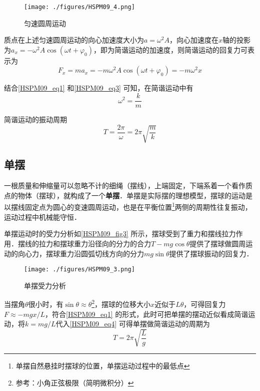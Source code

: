 \begin{figure}[ht]
\centering
\texttt{[image: ./figures/HSPM09\_4.png]}
\caption{匀速圆周运动} \label{HSPM09_fig4}
\end{figure}

质点在上述匀速圆周运动的向心加速度大小为$a=\omega^2 A$，向心加速度在$x$轴的投影为$a_x=-\omega^2 A\cos(\omega t + \varphi_0)$，即为简谐运动的加速度，则简谐运动的回复力可表示为
\begin{equation}\label{HSPM09_eq3}
F_x=ma_x=-m\omega^2 A\cos(\omega t + \varphi_0)= -m\omega^2 x
\end{equation}

结合\autoref{HSPM09_eq1} 和\autoref{HSPM09_eq3} 可知，在简谐运动中有
\begin{equation}
\omega^2=\frac km
\end{equation}

简谐运动的振动周期
\begin{equation}\label{HSPM09_eq4}
T=\frac {2\pi}{\omega}=2\pi\sqrt{\frac mk}
\end{equation}


\subsection{单摆}

一根质量和伸缩量可以忽略不计的细绳（摆线），上端固定，下端系着一个看作质点的物体（摆球），就构成了一个\textbf{单摆}．单摆是实际摆的理想模型，摆球的运动是以摆线固定点为圆心的变速圆周运动，也是在平衡位置\footnote{单摆自然悬挂时摆球的位置，单摆运动过程中的最低点}两侧的周期性往复振动，运动过程中机械能守恒．

单摆运动时的受力分析如\autoref{HSPM09_fig3} 所示，摆球受到了重力和摆线拉力作用．摆线的拉力和摆球重力沿径向的分力的合力$T-mg\cos\theta$提供了摆球做圆周运动的向心力，摆球重力沿圆弧切线方向的分力$mg\sin\theta$提供了摆球振动的回复力．

\begin{figure}[ht]
\centering
\texttt{[image: ./figures/HSPM09\_3.png]}
\caption{单摆受力分析} \label{HSPM09_fig3}
\end{figure}

当摆角$\theta$很小时，有$\sin\theta \approx \theta$\footnote{参考：小角正弦极限（简明微积分）}，摆球的位移大小$x$近似于$L\theta$，可得回复力$F \approx -mgx/L$，符合\autoref{HSPM09_eq1} 的形式，此时可把单摆的摆动近似看成简谐运动，将$k=mg/L$代入\autoref{HSPM09_eq4} 可得单摆做简谐运动的周期为
\begin{equation}
T=2\pi\sqrt{\frac Lg}
\end{equation}


